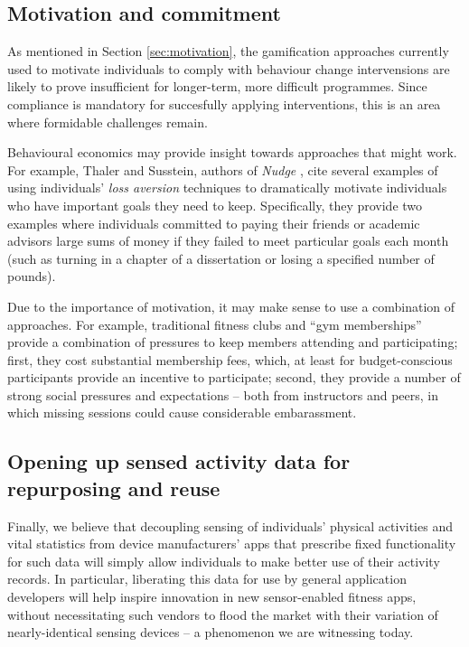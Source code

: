 \documentclass{sig-alternate}
\begin{document}

\subsection{Motivation and commitment}

As mentioned in Section \ref{sec:motivation}, the gamification
approaches currently used to motivate individuals to comply with
behaviour change intervensions are likely to prove insufficient for
longer-term, more difficult programmes. Since compliance is mandatory
for succesfully applying interventions, this is an area where
formidable challenges remain.

Behavioural economics may provide insight towards approaches that
might work.  For example, Thaler and Susstein, authors of \emph{Nudge}
\cite{nudge}, cite several examples of using individuals' \emph{loss
  aversion} techniques to dramatically motivate individuals who have
important goals they need to keep.  Specifically, they provide two
examples where individuals committed to paying their friends or
academic advisors large sums of money if they failed to meet
particular goals each month (such as turning in a chapter of a
dissertation or losing a specified number of pounds).

Due to the importance of motivation, it may make sense to use a
combination of approaches.  For example, traditional fitness clubs and
``gym memberships'' provide a combination of pressures to keep members
attending and participating; first, they cost substantial membership
fees, which, at least for budget-conscious participants provide an
incentive to participate; second, they provide a number of strong
social pressures and expectations -- both from instructors and peers,
in which missing sessions could cause considerable embarassment.

\subsection{Opening up sensed activity data for repurposing and reuse}

Finally, we believe that decoupling sensing of individuals' physical
activities and vital statistics from device manufacturers' apps that
prescribe fixed functionality for such data will simply allow
individuals to make better use of their activity records.  In
particular, liberating this data for use by general application
developers will help inspire innovation in new sensor-enabled fitness
apps, without necessitating such vendors to flood the market with
their variation of nearly-identical sensing devices -- a phenomenon we
are witnessing today.
\end{document}
